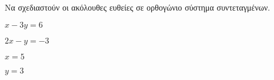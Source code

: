 Να σχεδιαστούν οι ακόλουθες ευθείες σε ορθογώνιο σύστημα συντεταγμένων.
\begin{multicols}{2}
\begin{rlist}[leftmargin=5mm]
\item $ x-3y=6 $
\item $ 2x-y=-3 $
\item $ x=5 $
\item $ y=3 $
\end{rlist}
\end{multicols}

